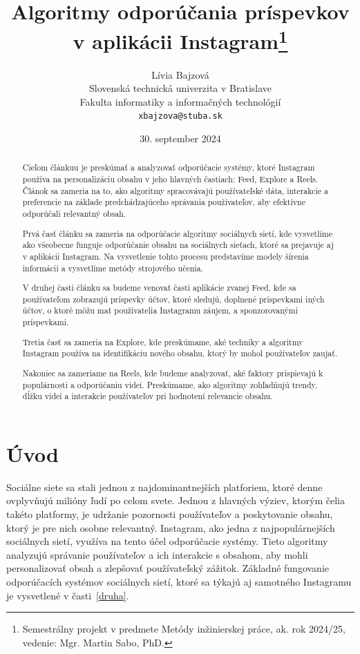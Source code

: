 \documentclass[10pt,twoside,slovak,a4paper]{article}
\title{Algoritmy odporúčania príspevkov v aplikácii Instagram\thanks{Semestrálny projekt v predmete Metódy inžinierskej práce, ak. rok 2024/25, vedenie: Mgr. Martin Sabo, PhD.}} %
\author{Lívia Bajzová\\[2pt]
	{\small Slovenská technická univerzita v Bratislave}\\
	{\small Fakulta informatiky a informačných technológií}\\
	{\small \texttt{xbajzova@stuba.sk}}
	}
\date{\small 30. september 2024} %
\begin{document}
\maketitle

\begin{abstract}
Cieľom článkuu je preskúmať a analyzovať odporúčacie systémy, ktoré Instagram používa na personalizáciu obsahu v jeho hlavných častiach: Feed, Explore a Reels. Článok sa zameria na to, ako algoritmy spracovávajú používateľské dáta, interakcie a preferencie na základe predchádzajúceho správania používateľov, aby efektívne odporúčali relevantný obsah.

Prvá časť článku sa zameria na odporúčacie algoritmy sociálnych sietí, kde vysvetlíme ako všeobecne funguje odporúčanie obsahu na sociálnych sieťach, ktoré sa prejavuje aj v aplikácii Instagram. Na vysvetlenie tohto procesu predstavíme modely šírenia informácií a vysvetlíme metódy strojového učenia.

V druhej časti článku sa budeme venovať časti aplikácie zvanej Feed, kde sa používateľom zobrazujú príspevky účtov, ktoré sledujú, doplnené príspevkami iných účtov, o ktoré môžu mať používatelia Instagramu záujem, a sponzorovanými príspevkami.

Tretia časť sa zameria na Explore, kde preskúmame, aké techniky a algoritmy Instagram používa na identifikáciu nového obsahu, ktorý by mohol používateľov zaujať.

Nakoniec sa zameriame na Reels, kde budeme analyzovať, aké faktory prispievajú k populárnosti a odporúčaniu videí. Preskúmame, ako algoritmy zohľadňujú trendy, dĺžku videí a interakcie používateľov pri hodnotení relevancie obsahu.



\end{abstract}



\section{Úvod}
Sociálne siete sa stali jednou z najdominantnejších platforiem, ktoré denne ovplyvňujú milióny ľudí po celom svete. Jednou z hlavných výziev, ktorým čelia takéto platformy, je udržanie pozornosti používateľov a poskytovanie obsahu, ktorý je pre nich osobne relevantný. Instagram, ako jedna z najpopulárnejších sociálnych sietí, využíva na tento účel odporúčacie systémy. Tieto algoritmy analyzujú správanie používateľov a ich interakcie s obsahom, aby mohli personalizovať obsah a zlepšovať používateľský zážitok. Základné fungovanie odporúčacích systémov sociálnych sietí, ktoré sa týkajú aj samotného Instagramu je vysvetlené v časti~\ref{druha}.
\end{document}

